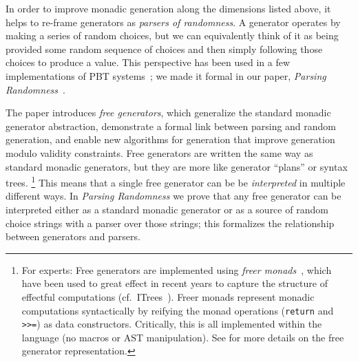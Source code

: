 In order to improve monadic generation along the dimensions listed
above, it helps to re-frame generators as {\em parsers of randomness}. A generator
operates by making a series of random choices, but we can equivalently think of
it as being provided some random sequence of choices and then simply following
those choices to produce a value. This perspective has been used in a few
implementations of PBT
systems~\cite{maciver2019hypothesis, dolan2017testing}; we made it
formal in our paper, {\em Parsing Randomness}~\cite{goldstein2022parsing}.

The paper introduces {\em free generators}, which generalize the standard
monadic generator abstraction, demonstrate a formal link between parsing and
random generation, and enable new algorithms for generation that improve
generation modulo validity constraints. Free generators are written the same
way as standard monadic generators, but they are more like generator ``plans''
or syntax trees.%
\footnote{For experts: Free generators are implemented using {\em freer
monads}~\cite{kiselyov2015freer}, which have been used to great effect in recent
years to capture the structure of effectful computations
(cf.~ITrees~\cite{old:xia2019interaction}). Freer monads represent
monadic computations syntactically by reifying the monad operations
(\lstinline{return} and \lstinline{>>=}) as data constructors. Critically, this
is all implemented within the language (no macros or AST
manipulation). See \cite{goldstein2022parsing} for more details on the
free generator representation.}
This means that a single free generator can be be {\em interpreted} in multiple
different ways. In {\em Parsing Randomness} we prove that any free generator can
be interpreted either as a standard monadic generator or as a source of
random choice strings with a parser over those strings; this formalizes the
relationship between generators and parsers.


